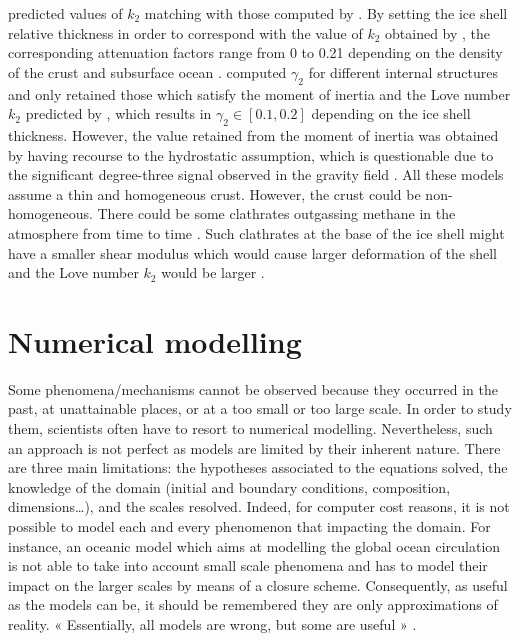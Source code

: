  \citet{beuthe2015tidal} predicted values of $k_2$ matching with those computed by \citet{iess2012tides}. By setting the ice shell relative thickness in order to correspond with the value of $k_2$ obtained by \citet{iess2012tides,durante2019titan}, the corresponding attenuation factors range from 0 to 0.21 depending on the density of the crust and subsurface ocean \citep[See Fig.~5 in][]{beuthe2015tidal}. \citet{tokano2014numerical} computed $\gamma_2$ for different internal structures and only retained those which satisfy the moment of inertia and the Love number $k_2$ predicted by \citet{iess2012tides}, which results in $\gamma_2\in[0.1,0.2]$ depending on the ice shell thickness. However, the value retained from the moment of inertia was obtained by having recourse to the hydrostatic assumption, which is questionable due to the significant degree-three signal observed in the gravity field \citep{hemingway2013rigid, lefevre2014structure, baland2014titan}. All these models assume a thin and homogeneous crust. However, the crust could be non-homogeneous. There could be some clathrates outgassing methane in the atmosphere from time to time \citep{tobie2006episodic}. Such clathrates at the base of the ice shell might have a smaller shear modulus which would cause larger deformation of the shell and the Love number $k_2$ would be larger \citep{rappaport2008can}.




\section{Numerical modelling} 
Some phenomena/mechanisms cannot be observed because they occurred in the past, at unattainable places, or at a too small or too large scale. In order to study them, scientists often have to resort to numerical modelling. Nevertheless, such an approach is not perfect as models are limited by their inherent nature. There are three main limitations: the hypotheses associated to the equations solved, the knowledge of the domain (initial and boundary conditions, composition, dimensions\dots), and the scales resolved. Indeed, for computer cost reasons, it is not possible to model each and every phenomenon that impacting the domain. For instance, an oceanic model which aims at modelling the global ocean circulation is not able to take into account small scale phenomena and has to model their impact on the larger scales by means of a closure scheme. Consequently, as useful as the models can be, it should be remembered they are only approximations of reality. « Essentially, all models are wrong, but some are useful » \citep{box1987empirical}. 


